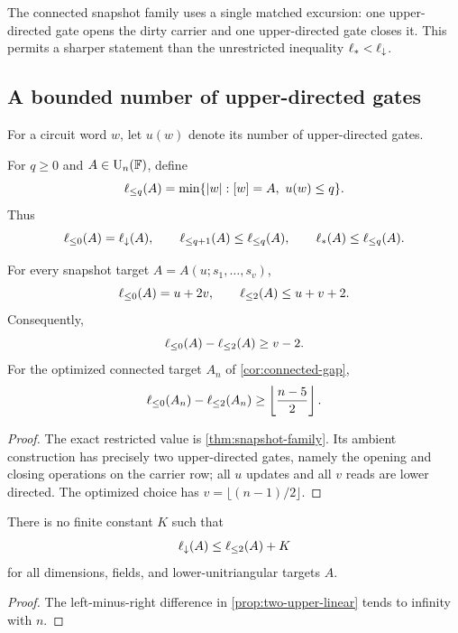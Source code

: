 The connected snapshot family uses a single matched excursion: one upper-directed gate opens the dirty carrier and one upper-directed gate closes it.  This permits a sharper statement than the unrestricted inequality $\ell_{*}<\ell_{\downarrow}$.

\subsection{A bounded number of upper-directed gates}

For a circuit word $w$, let $u(w)$ denote its number of upper-directed gates.

\begin{definition}
For $q\ge0$ and $A\in\operatorname{U}_n(\mathbb F)$, define
\[
\ell_{\le q}(A)
=
\min\{|w|:[w]=A,\ u(w)\le q\}.
\]
Thus
\[
\ell_{\le 0}(A)=\ell_{\downarrow}(A),
\qquad
\ell_{\le q+1}(A)\le\ell_{\le q}(A),
\qquad
\ell_{*}(A)\le\ell_{\le q}(A).
\]
\end{definition}

\begin{proposition}\label{prop:two-upper-linear}
For every snapshot target $A=A(u;s_1,\ldots,s_v)$,
\[
\ell_{\le 0}(A)=u+2v,
\qquad
\ell_{\le 2}(A)\le u+v+2.
\]
Consequently,
\[
\ell_{\le 0}(A)-\ell_{\le 2}(A)\ge v-2.
\]
For the optimized connected target $A_n$ of \cref{cor:connected-gap},
\[
\ell_{\le 0}(A_n)-\ell_{\le 2}(A_n)
\ge
\left\lfloor\frac{n-5}{2}\right\rfloor.
\]
\end{proposition}

\begin{proof}
The exact restricted value is \cref{thm:snapshot-family}.  Its ambient construction has precisely two upper-directed gates, namely the opening and closing operations on the carrier row; all $u$ updates and all $v$ reads are lower directed.  The optimized choice has $v=\lfloor(n-1)/2\rfloor$.
\end{proof}

\begin{corollary}\label{cor:no-budget-only}
There is no finite constant $K$ such that
\[
\ell_{\downarrow}(A)\le\ell_{\le 2}(A)+K
\]
for all dimensions, fields, and lower-unitriangular targets $A$.
\end{corollary}

\begin{proof}
The left-minus-right difference in \cref{prop:two-upper-linear} tends to infinity with $n$.
\end{proof}

